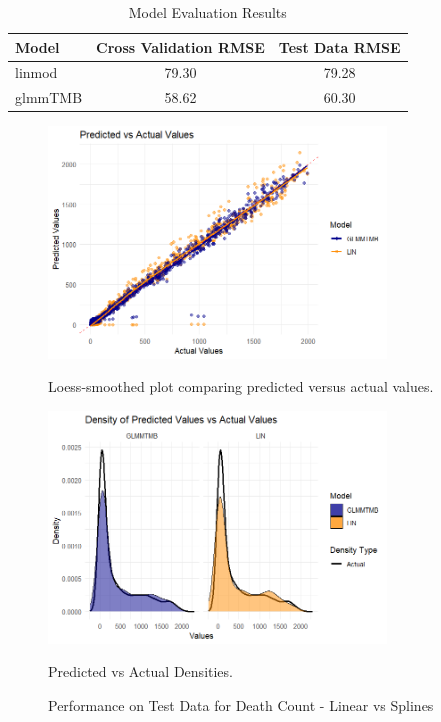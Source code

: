 \documentclass[12pt, twoside,hidelinks]{article}
\theoremstyle{definition}
\numberwithin{equation}{section}
\begin{document}
\begin{table}[H]
\centering
\caption{Model Evaluation Results}
\label{table:model_evaluationmort}
\begin{tabular}{lcc}
\hline
\textbf{Model} & \textbf{Cross Validation RMSE} & \textbf{Test Data RMSE} \\
\hline
linmod & 79.30  & 79.28 \\
glmmTMB & 58.62 & 60.30 \\
\hline
\end{tabular}
\end{table}



\begin{figure}[H]
\centering

\includegraphics[width=0.8\textwidth]{visuals/mortalityData/mortpredvactLIN.png}
\caption*{Loess-smoothed plot comparing predicted versus actual values.}
\label{fig:hist_pred_errors}

\includegraphics[width=0.8\textwidth]{visuals/mortalityData/mortdenspredvactLIN.png}
\caption*{Predicted vs Actual Densities.}
\label{fig:predicted_vs_actual_densities}

\caption{Performance on Test Data for Death Count - Linear vs Splines}
\label{fig:test_data_performance_4}
\end{figure}
\end{document}

